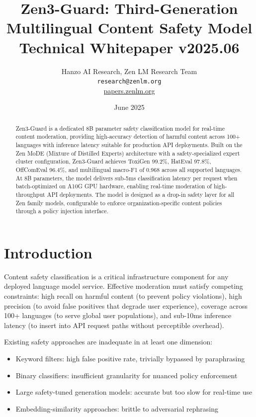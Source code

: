 \documentclass[11pt,a4paper]{article}
\title{\textbf{Zen3-Guard: Third-Generation Multilingual Content Safety Model}\\
\large Technical Whitepaper v2025.06}
\author{Hanzo AI Research, Zen LM Research Team\\
\texttt{research@zenlm.org}\\
\href{https://papers.zenlm.org}{papers.zenlm.org}}
\date{June 2025}
\begin{document}
\maketitle

\begin{abstract}
Zen3-Guard is a dedicated 8B parameter safety classification model for real-time content
moderation, providing high-accuracy detection of harmful content across 100+ languages
with inference latency suitable for production API deployments. Built on the Zen MoDE
(Mixture of Distilled Experts) architecture with a safety-specialized expert cluster
configuration, Zen3-Guard achieves ToxiGen 99.2\%, HatEval 97.8\%, OffComEval 96.4\%,
and multilingual macro-F1 of 0.968 across all supported languages. At 8B parameters,
the model delivers sub-5ms classification latency per request when batch-optimized on
A10G GPU hardware, enabling real-time moderation of high-throughput API deployments.
The model is designed as a drop-in safety layer for all Zen family models, configurable
to enforce organization-specific content policies through a policy injection interface.
\end{abstract}

\tableofcontents
\newpage

\section{Introduction}
\label{sec:intro}

Content safety classification is a critical infrastructure component for any deployed
language model service. Effective moderation must satisfy competing constraints:
high recall on harmful content (to prevent policy violations), high precision (to
avoid false positives that degrade user experience), coverage across 100+ languages
(to serve global user populations), and sub-10ms inference latency (to insert into
API request paths without perceptible overhead).

Existing safety approaches are inadequate in at least one dimension:
\begin{itemize}
\item Keyword filters: high false positive rate, trivially bypassed by paraphrasing
\item Binary classifiers: insufficient granularity for nuanced policy enforcement
\item Large safety-tuned generation models: accurate but too slow for real-time use
\item Embedding-similarity approaches: brittle to adversarial rephrasing
\end{itemize}
\end{document}
